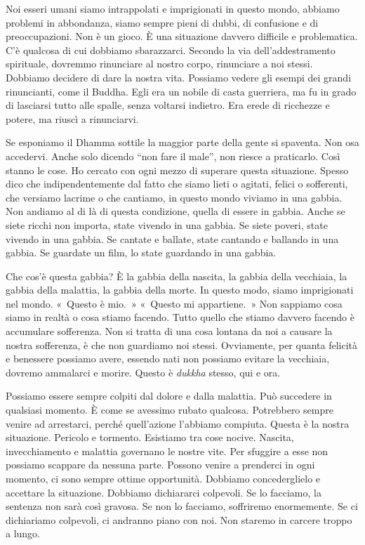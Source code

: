 Noi esseri umani siamo intrappolati e imprigionati in questo mondo,
abbiamo problemi in abbondanza, siamo sempre pieni di dubbi, di
confusione e di preoccupazioni. Non è un gioco. È una situazione davvero
difficile e problematica. C'è qualcosa di cui dobbiamo sbarazzarci.
Secondo la via dell'addestramento spirituale, dovremmo rinunciare al
nostro corpo, rinunciare a noi stessi. Dobbiamo decidere di dare la
nostra vita. Possiamo vedere gli esempi dei grandi rinuncianti, come il
Buddha. Egli era un nobile di casta guerriera, ma fu in grado di
lasciarsi tutto alle spalle, senza voltarsi indietro. Era erede di
ricchezze e potere, ma riuscì a rinunciarvi.

Se esponiamo il Dhamma sottile la maggior parte della gente si spaventa.
Non osa accedervi. Anche solo dicendo ``non fare il male'', non riesce a
praticarlo. Così stanno le cose. Ho cercato con ogni mezzo di superare
questa situazione. Spesso dico che indipendentemente dal fatto che siamo
lieti o agitati, felici o sofferenti, che versiamo lacrime o che
cantiamo, in questo mondo viviamo in una gabbia. Non andiamo al di là di
questa condizione, quella di essere in gabbia. Anche se siete ricchi non
importa, state vivendo in una gabbia. Se siete poveri, state vivendo in
una gabbia. Se cantate e ballate, state cantando e ballando in una
gabbia. Se guardate un film, lo state guardando in una gabbia.

Che cos'è questa gabbia? È la gabbia della nascita, la gabbia della
vecchiaia, la gabbia della malattia, la gabbia della morte. In questo
modo, siamo imprigionati nel mondo. «~Questo è mio.~» «~Questo mi
appartiene.~» Non sappiamo cosa siamo in realtà o cosa stiamo facendo.
Tutto quello che stiamo davvero facendo è accumulare sofferenza. Non si
tratta di una cosa lontana da noi a causare la nostra sofferenza, è che
non guardiamo noi stessi. Ovviamente, per quanta felicità e benessere
possiamo avere, essendo nati non possiamo evitare la vecchiaia, dovremo
ammalarci e morire. Questo è \emph{dukkha} stesso, qui e ora.

Possiamo essere sempre colpiti dal dolore e dalla malattia. Può
succedere in qualsiasi momento. È come se avessimo rubato qualcosa.
Potrebbero sempre venire ad arrestarci, perché quell'azione l'abbiamo
compiuta. Questa è la nostra situazione. Pericolo e tormento. Esistiamo
tra cose nocive. Nascita, invecchiamento e malattia governano le nostre
vite. Per sfuggire a esse non possiamo scappare da nessuna parte.
Possono venire a prenderci in ogni momento, ci sono sempre ottime
opportunità. Dobbiamo concederglielo e accettare la situazione. Dobbiamo
dichiararci colpevoli. Se lo facciamo, la sentenza non sarà così
gravosa. Se non lo facciamo, soffriremo enormemente. Se ci dichiariamo
colpevoli, ci andranno piano con noi. Non staremo in carcere troppo a
lungo.

